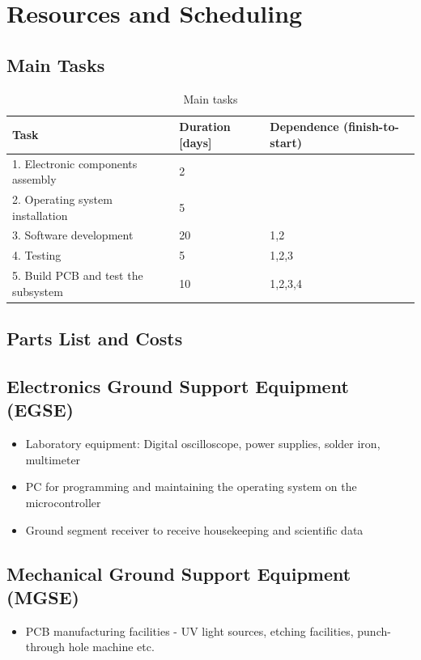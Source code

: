 \documentclass[fontsize=11pt,paper=a4,]{scrartcl}
\begin{document}
\section{Resources and Scheduling}
\subsection{Main Tasks}
\begin{table}[htbp!]
\centering
\caption{Main tasks}
\label{tab:main_tasks}
\begin{tabular}{| l | l | l |} \hline
Task & Duration [days] & Dependence (finish-to-start) \\ \hline
1. Electronic components assembly & 2 & \\ \hline
2. Operating system installation & 5 & \\ \hline
3. Software development & 20 & 1,2 \\ \hline
4. Testing & 5 & 1,2,3 \\ \hline
5. Build PCB and test the subsystem & 10 & 1,2,3,4 \\ \hline
\end{tabular}
\vspace{-1.0em}
\end{table}


\subsection{Parts List and Costs}
\subsection{Electronics Ground Support Equipment (EGSE)}
\begin{itemize}
\item Laboratory equipment: Digital oscilloscope, power supplies, solder iron, multimeter
\item PC for programming and maintaining the operating system on the microcontroller
\item Ground segment receiver to receive housekeeping and scientific data
\end{itemize}

\subsection{Mechanical Ground Support Equipment (MGSE)}
\begin{itemize}
\item PCB manufacturing facilities - UV light sources, etching facilities, punch-through hole machine etc.
\end{itemize}
\end{document}
